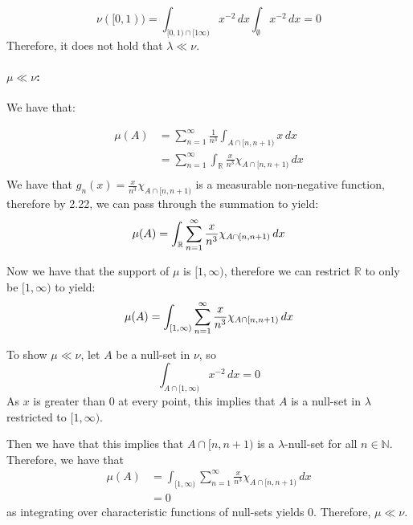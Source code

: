 \documentclass{article}
\theoremstyle{definition}
\numberwithin{theorem}{section}
\numberwithin{equation}{section}
\begin{document}
\begin{equation}
	\nu([0, 1)) = \int_{[0, 1) \cap [1 \infty)} x^{-2} \, dx\int_{\emptyset} x^{-2} \, dx = 0
\end{equation}
Therefore, it does not hold that $\lambda \ll \nu$. 

\paragraph{$\mu \ll \nu$:}
We have that:

\begin{align*}
	\mu(A) &= \sum_{n = 1}^{\infty} \frac{1}{n^3} \int_{A\cap [n, n + 1)} x \, dx \\
	&=\sum_{n = 1}^{\infty} \int_{\mathbb{R}} \frac{x}{n^3} \chi_{A\cap [n, n + 1)} \, dx \\
\end{align*}
We have that $g_n(x) = \frac{x}{n^3} \chi_{A\cap [n, n + 1)}$ is a measurable non-negative function, therefore by 2.22, we can pass through the summation to yield:
\begin{equation}
		\mu(A) = \int_{\mathbb{R}}\sum_{n = 1}^{\infty} \frac{x}{n^3} \chi_{A\cap [n, n + 1)} \, dx \\
\end{equation}

Now we have that the support of $\mu$ is $[1, \infty)$, therefore we can restrict $\mathbb{R}$ to only be $[1, \infty)$ to yield:
\begin{equation}
	\mu(A) = \int_{[1, \infty)}\sum_{n = 1}^{\infty} \frac{x}{n^3} \chi_{A\cap [n, n + 1)} \, dx \\
\end{equation}

To show $\mu \ll \nu$, let $A$ be a null-set in $\nu$, so
\begin{equation}
	\int_{A \cap [1, \infty)} x^{-2}\, dx = 0
\end{equation}
As $x$ is greater than 0 at every point, this implies that $A$ is a null-set in $\lambda$ restricted to $[1, \infty)$.

Then we have that this implies that $ A \cap [n, n + 1)$ is a $\lambda$-null-set for all $n \in \mathbb{N}$. Therefore, we have that
\begin{align*}
	\mu(A) &= \int_{[1, \infty)}\sum_{n = 1}^{\infty} \frac{x}{n^3} \chi_{A\cap [n, n + 1)} \, dx \\
	&= 0
\end{align*}
as integrating over characteristic functions of null-sets yields 0.
Therefore, $\mu \ll \nu$. 
\end{document}

